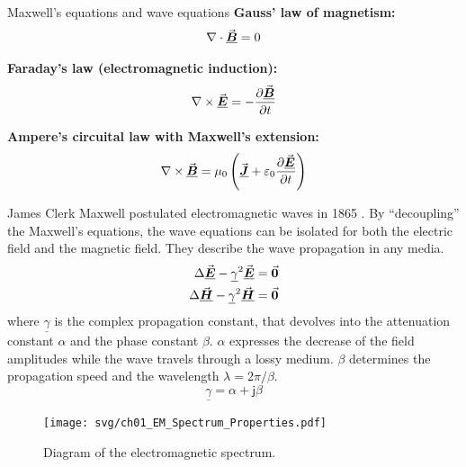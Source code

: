 \begin{refsection}
\begin{excursus}{Maxwell's equations and wave equations}
	\textbf{Gauss' law of magnetism:}
	\begin{equation}
		\nabla \cdot \vec{\bm{\underline{B}}} = 0
	\end{equation}
	
	\textbf{Faraday's law (electromagnetic induction):}
	\begin{equation}
		\nabla \times \vec{\bm{\underline{E}}} = - \frac{\partial \vec{\bm{\underline{B}}}}{\partial t}
	\end{equation}
	
	\textbf{Ampere's circuital law with Maxwell's extension:}
	\begin{equation}
		\nabla \times \vec{\bm{\underline{B}}} = \mu_0 \left(\vec{\bm{\underline{J}}} + \varepsilon_0 \frac{\partial \vec{\bm{\underline{E}}}}{\partial t} \right)
	\end{equation}
	
	James Clerk Maxwell postulated electromagnetic waves in 1865 \cite{Maxwell1864}. By ``decoupling'' the Maxwell's equations, the wave equations can be isolated for both the electric field and the magnetic field. They describe the wave propagation in any media.
	\begin{subequations}
		\begin{align}
			\Delta \vec{\bm{\underline{E}}} - \underline{\gamma}^2 \vec{\bm{\underline{E}}} &= \vec{\bm{0}} \\
			\Delta \vec{\bm{\underline{H}}} - \underline{\gamma}^2 \vec{\bm{\underline{H}}} &= \vec{\bm{0}}
		\end{align}
	\end{subequations}
	where $\underline{\gamma}$ is the complex propagation constant, that devolves into the attenuation constant $\alpha$ and the phase constant $\beta$. $\alpha$ expresses the decrease of the field amplitudes while the wave travels through a lossy medium. $\beta$ determines the propagation speed and the wavelength $\lambda = 2 \pi / \beta$.
	\begin{equation}
		\underline{\gamma} = \alpha + \mathsf{j} \beta
	\end{equation}
\end{excursus}

\begin{figure}[H]
	\centering
	\texttt{[image: svg/ch01\_EM\_Spectrum\_Properties.pdf]}
	\caption{Diagram of the electromagnetic spectrum. }
\end{figure}


\end{refsection}

